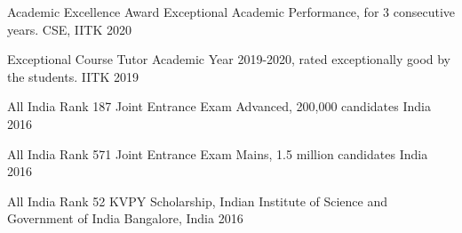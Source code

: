 
\begin{cvhonors}

  \cvhonor
    {Academic Excellence Award} %
    {Exceptional Academic Performance, for 3 consecutive years.} %
    {CSE, IITK} %
    {2020} %

  \cvhonor
    {Exceptional Course Tutor} %
    {Academic Year 2019-2020, rated exceptionally good by the students.} %
    {IITK} %
    {2019} %

  \cvhonor
    {All India Rank 187} %
    {Joint Entrance Exam Advanced, 200,000 candidates} %
    {India} %
    {2016} %

  \cvhonor
    {All India Rank 571} %
    {Joint Entrance Exam Mains, 1.5 million candidates} %
    {India} %
    {2016} %

  \cvhonor
    {All India Rank 52} %
    {KVPY Scholarship, Indian Institute of Science and Government of India} %
    {Bangalore, India} %
    {2016} %

%

\end{cvhonors}
